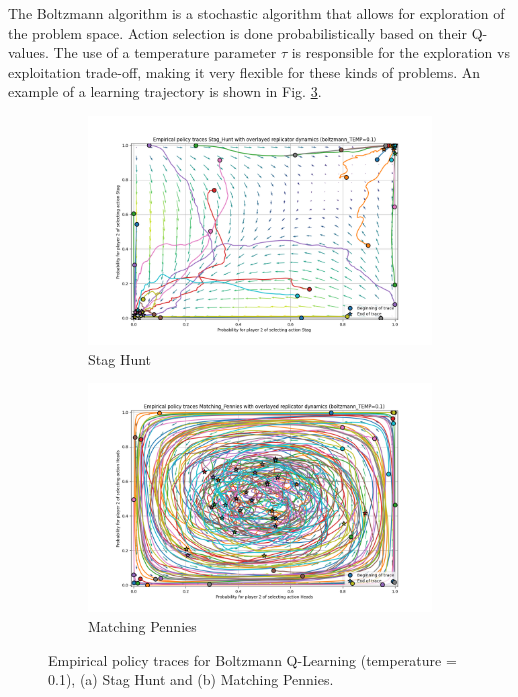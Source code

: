 \documentclass[12pt,a4paper, onecolumn]{exam}
\begin{document}
The Boltzmann algorithm is a stochastic algorithm that allows for exploration of the problem space. Action selection is done probabilistically based on their Q-values.
The use of a temperature parameter $\tau$ is responsible for the exploration vs exploitation trade-off, making it very flexible for these kinds of problems.
An example of a learning trajectory is shown in Fig. \ref{fig:boltzmann_combined}.
\begin{figure}[h]
    \centering
    \begin{subfigure}{0.49\textwidth}
        \centering
        \includegraphics[width=\linewidth]{plots/replicator_trajectoreis_Stag_Hunt_boltzmann_TEMP=0.1.png}
        \caption{Stag Hunt}
        \label{fig:bsh}
    \end{subfigure}
    \hfill
    \begin{subfigure}{0.49\textwidth}
        \centering
        \includegraphics[width=\linewidth]{plots/replicator_trajectoreis_Matching_Pennies_boltzmann_TEMP=0.1.png}
        \caption{Matching Pennies}
        \label{fig:bmp}
    \end{subfigure}
    \caption{Empirical policy traces for Boltzmann Q-Learning (temperature = 0.1), (a) Stag Hunt and (b) Matching Pennies.}
    \label{fig:boltzmann_combined}
\end{figure}
\end{document}
